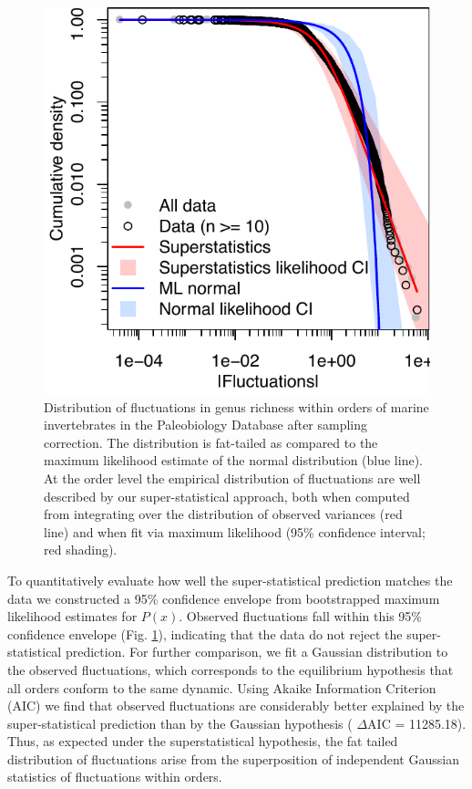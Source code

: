 \documentclass[12pt]{article}
\let\citep=\cite
\begin{document}
\begin{figure}[!h]
  \centering
  \includegraphics[scale=1]{figs/fig_Px.pdf} 
  \caption[Order-level distribution of richness
  fluctuations]{Distribution of fluctuations in genus richness within
    orders of marine invertebrates in the Paleobiology Database
    \citep{alroy08} after sampling correction. The distribution is
    fat-tailed as compared to the maximum likelihood estimate of the
    normal distribution (blue line).  At the order level the empirical
    distribution of fluctuations are well described by our
    super-statistical approach, both when computed from integrating
    over the distribution of observed variances (red line) and when
    fit via maximum likelihood (95\% confidence interval; red
    shading).}
  \label{fig:Px}
\end{figure}

To quantitatively evaluate how well the super-statistical prediction
matches the data we constructed a 95\% confidence envelope from
bootstrapped maximum likelihood estimates for $P(x)$. Observed
fluctuations fall within this 95\% confidence envelope
(Fig. \ref{fig:Px}), indicating that the data do not reject the
super-statistical prediction. For further comparison, we fit a
Gaussian distribution to the observed fluctuations, which corresponds
to the equilibrium hypothesis that all orders conform to the same
dynamic. Using Akaike Information Criterion (AIC) we find that
observed fluctuations are considerably better explained by the
super-statistical prediction than by the Gaussian hypothesis ({\small
  $\Delta$}AIC = 11285.18). Thus, as expected under the
superstatistical hypothesis, the fat tailed distribution of
fluctuations arise from the superposition of independent Gaussian
statistics of fluctuations within orders.
\end{document}
